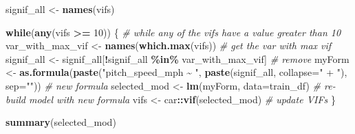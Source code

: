 \documentclass[
]{article}
\newenvironment{Shaded}{\begin{snugshade}}{\end{snugshade}}
\newcommand{\AttributeTok}[1]{\textcolor[rgb]{0.13,0.29,0.53}{#1}}
\newcommand{\CommentTok}[1]{\textcolor[rgb]{0.56,0.35,0.01}{\textit{#1}}}
\newcommand{\ControlFlowTok}[1]{\textcolor[rgb]{0.13,0.29,0.53}{\textbf{#1}}}
\newcommand{\DecValTok}[1]{\textcolor[rgb]{0.00,0.00,0.81}{#1}}
\newcommand{\FunctionTok}[1]{\textcolor[rgb]{0.13,0.29,0.53}{\textbf{#1}}}
\newcommand{\NormalTok}[1]{#1}
\newcommand{\OtherTok}[1]{\textcolor[rgb]{0.56,0.35,0.01}{#1}}
\newcommand{\SpecialCharTok}[1]{\textcolor[rgb]{0.81,0.36,0.00}{\textbf{#1}}}
\newcommand{\StringTok}[1]{\textcolor[rgb]{0.31,0.60,0.02}{#1}}
\begin{document}
\begin{Shaded}
\begin{Highlighting}[]
\NormalTok{signif\_all }\OtherTok{\textless{}{-}} \FunctionTok{names}\NormalTok{(vifs)}

\ControlFlowTok{while}\NormalTok{(}\FunctionTok{any}\NormalTok{(vifs }\SpecialCharTok{\textgreater{}=} \DecValTok{10}\NormalTok{)) \{  }\CommentTok{\# while any of the vifs have a value greater than 10}
\NormalTok{  var\_with\_max\_vif }\OtherTok{\textless{}{-}} \FunctionTok{names}\NormalTok{(}\FunctionTok{which.max}\NormalTok{(vifs))  }\CommentTok{\# get the var with max vif}
\NormalTok{  signif\_all }\OtherTok{\textless{}{-}}\NormalTok{ signif\_all[}\SpecialCharTok{!}\NormalTok{signif\_all }\SpecialCharTok{\%in\%}\NormalTok{ var\_with\_max\_vif]  }\CommentTok{\# remove}
\NormalTok{  myForm }\OtherTok{\textless{}{-}} \FunctionTok{as.formula}\NormalTok{(}\FunctionTok{paste}\NormalTok{(}\StringTok{"pitch\_speed\_mph \textasciitilde{} "}\NormalTok{, }\FunctionTok{paste}\NormalTok{(signif\_all, }\AttributeTok{collapse=}\StringTok{" + "}\NormalTok{), }\AttributeTok{sep=}\StringTok{""}\NormalTok{))  }\CommentTok{\# new formula}
\NormalTok{  selected\_mod }\OtherTok{\textless{}{-}} \FunctionTok{lm}\NormalTok{(myForm, }\AttributeTok{data=}\NormalTok{train\_df)  }\CommentTok{\# re{-}build model with new formula}
\NormalTok{  vifs }\OtherTok{\textless{}{-}}\NormalTok{ car}\SpecialCharTok{::}\FunctionTok{vif}\NormalTok{(selected\_mod)  }\CommentTok{\# update VIFs}
\NormalTok{\}}

\FunctionTok{summary}\NormalTok{(selected\_mod)}
\end{Highlighting}
\end{Shaded}
\end{document}
